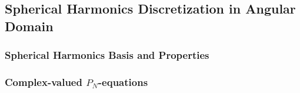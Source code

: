 

\subsection{Spherical Harmonics Discretization in Angular Domain}
\subsubsection{Spherical Harmonics Basis and Properties}
\subsubsection{Complex-valued $P_N$-equations}